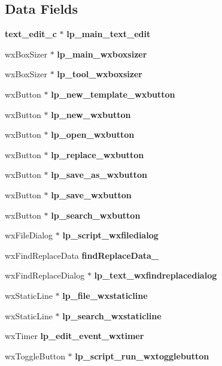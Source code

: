 \subsection*{Data Fields}
\begin{DoxyCompactItemize}
\item 
\mbox{\label{classeditor_acd4c1c633a39875732ca80851af75915}} 
\textbf{ text\+\_\+edit\+\_\+c} $\ast$ {\bfseries lp\+\_\+main\+\_\+text\+\_\+edit}
\item 
\mbox{\label{classeditor_a51d1b21a81f74c345c442debbf2fd315}} 
wx\+Box\+Sizer $\ast$ {\bfseries lp\+\_\+main\+\_\+wxboxsizer}
\item 
\mbox{\label{classeditor_acfd79996d679cb715a8310f643d41b54}} 
wx\+Box\+Sizer $\ast$ {\bfseries lp\+\_\+tool\+\_\+wxboxsizer}
\item 
\mbox{\label{classeditor_aec0c73fb91e86a72dcdddc4f94aa1302}} 
wx\+Button $\ast$ {\bfseries lp\+\_\+new\+\_\+template\+\_\+wxbutton}
\item 
\mbox{\label{classeditor_a29841ac3efc5dea788051191c14bccf7}} 
wx\+Button $\ast$ {\bfseries lp\+\_\+new\+\_\+wxbutton}
\item 
\mbox{\label{classeditor_aff886db8078a566a62d061e87918960d}} 
wx\+Button $\ast$ {\bfseries lp\+\_\+open\+\_\+wxbutton}
\item 
\mbox{\label{classeditor_aaf30e441e24ffb0e13027175aa5a1d75}} 
wx\+Button $\ast$ {\bfseries lp\+\_\+replace\+\_\+wxbutton}
\item 
\mbox{\label{classeditor_a2ae17f4d3eaddfcfd88b6e5753d20133}} 
wx\+Button $\ast$ {\bfseries lp\+\_\+save\+\_\+as\+\_\+wxbutton}
\item 
\mbox{\label{classeditor_aca4f6b89be3b4e9e7877b7b6f06a3cc4}} 
wx\+Button $\ast$ {\bfseries lp\+\_\+save\+\_\+wxbutton}
\item 
\mbox{\label{classeditor_a5f1a915f0eba4657f7969c9e238d6281}} 
wx\+Button $\ast$ {\bfseries lp\+\_\+search\+\_\+wxbutton}
\item 
\mbox{\label{classeditor_a695f0d49aab279eaceef280ef38a034c}} 
wx\+File\+Dialog $\ast$ {\bfseries lp\+\_\+script\+\_\+wxfiledialog}
\item 
\mbox{\label{classeditor_a82a0623923fcf6bc3ead5405b10efe88}} 
wx\+Find\+Replace\+Data {\bfseries find\+Replace\+Data\+\_}
\item 
\mbox{\label{classeditor_a0eec2813b0f58f7e5e6d0142a91d5256}} 
wx\+Find\+Replace\+Dialog $\ast$ {\bfseries lp\+\_\+text\+\_\+wxfindreplacedialog}
\item 
\mbox{\label{classeditor_acd314dc1668c12967a2dabba3d4e1026}} 
wx\+Static\+Line $\ast$ {\bfseries lp\+\_\+file\+\_\+wxstaticline}
\item 
\mbox{\label{classeditor_a11efe0ca3bc1bbc0118b034693a421e5}} 
wx\+Static\+Line $\ast$ {\bfseries lp\+\_\+search\+\_\+wxstaticline}
\item 
\mbox{\label{classeditor_a5eb426bd2b6d00d582f5050ccd7e5a01}} 
wx\+Timer {\bfseries lp\+\_\+edit\+\_\+event\+\_\+wxtimer}
\item 
\mbox{\label{classeditor_a27feadbc0af2ef7bc5e7b7b2e1e0377b}} 
wx\+Toggle\+Button $\ast$ {\bfseries lp\+\_\+script\+\_\+run\+\_\+wxtogglebutton}
\end{DoxyCompactItemize}
